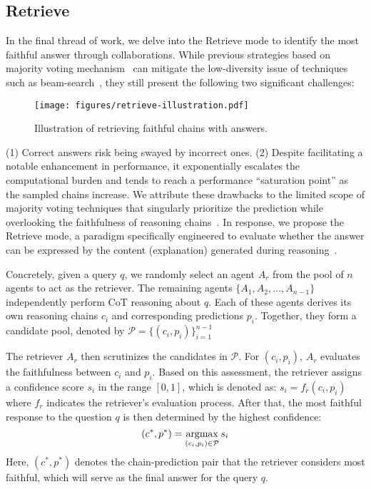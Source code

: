 \subsection{Retrieve}
\label{section:retrieve}


In the final thread of work, we delve into the Retrieve mode to identify the most faithful answer through collaborations. 
While previous strategies based on majority voting mechanism~\citep{wang2023sc, fu2023complexcot} can mitigate the low-diversity issue of techniques such as beam-search~\citep{li2016mutalia},
they still present the following two significant challenges:
\begin{wrapfigure}{r}{4.575cm}
\vspace{-1em}
    \centering
    \texttt{[image: figures/retrieve-illustration.pdf]}
    \caption{Illustration of retrieving faithful chains with answers.}
    \vspace{-1.75em}
    \label{fig:retrieve-illustration}
\end{wrapfigure}
(1) Correct answers risk being swayed by incorrect ones.
(2) Despite facilitating a notable enhancement in performance, 
it exponentially escalates the computational burden and tends to reach a performance ``saturation point'' as the sampled chains increase.
We attribute these drawbacks to the limited scope of majority voting techniques that singularly prioritize the prediction while overlooking the faithfulness of reasoning chains~\citep{li2022on}.
In response, 
we propose the Retrieve mode,
a paradigm specifically engineered to evaluate whether the answer can be expressed by the content (explanation) generated during reasoning~\citep{jacovi2020towards, lanham2023measuring}.

Concretely,
given a query \( q \), 
we randomly select an agent \( A_r \) from the pool of \( n \) agents to act as the retriever. 
The remaining agents \( \{A_1, A_2, \ldots, A_{n-1}\} \) independently perform CoT reasoning about \( q \). 
Each of these agents derives its own reasoning chains \( c_i \) and corresponding predictions \( p_i \). 
Together, 
they form a candidate pool, 
denoted by $\mathcal{P} = \{(c_i, p_i)\}_{i=1}^{n-1}$

The retriever \( A_r \) then scrutinizes the candidates in $\mathcal{P}$. For \( (c_i, p_i) \), 
\( A_r \) evaluates the faithfulness between \( c_i \) and \( p_i \). 
Based on this assessment, the retriever assigns a confidence score \( s_i \) in the range \([0,1]\),
which is denoted as: \( s_i = f_r(c_i, p_i) \)
where \( f_r \) indicates the retriever's evaluation process.
After that,
the most faithful response to the question \( q \) is then determined by the highest confidence:
\[ (c^*, p^*) = \operatorname*{argmax}_{(c_i, p_i) \in \mathcal{P}} s_i \]
Here, \( (c^*, p^*) \) denotes the chain-prediction pair that the retriever considers most faithful,
which will serve as the final answer for the query \( q \).

